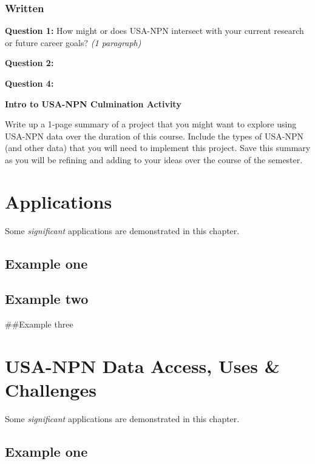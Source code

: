 \documentclass[]{book}
\begin{document}
\hypertarget{ds-challenge}{}
\hypertarget{written}{%
\subsection{Written}\label{written}}

\textbf{Question 1:} How might or does USA-NPN
intersect with your current research or future career goals? \emph{(1 paragraph)}

\textbf{Question 2:}

\textbf{Question 4:}

\textbf{Intro to USA-NPN Culmination Activity}

Write up a 1-page summary of a project that you might want to explore using USA-NPN data over the duration of this course. Include the types of USA-NPN (and other data) that you will need to implement this project. Save this summary as you will be refining and adding to your ideas over the course of the semester.

\hypertarget{applications}{%
\chapter{Applications}\label{applications}}

Some \emph{significant} applications are demonstrated in this chapter.

\hypertarget{example-one}{%
\section{Example one}\label{example-one}}

\hypertarget{example-two}{%
\section{Example two}\label{example-two}}

\#\#Example three

\hypertarget{usa-npn-data-access-uses-challenges}{%
\chapter{USA-NPN Data Access, Uses \& Challenges}\label{usa-npn-data-access-uses-challenges}}

Some \emph{significant} applications are demonstrated in this chapter.

\hypertarget{example-one}{%
\section{Example one}\label{example-one}}
\end{document}
